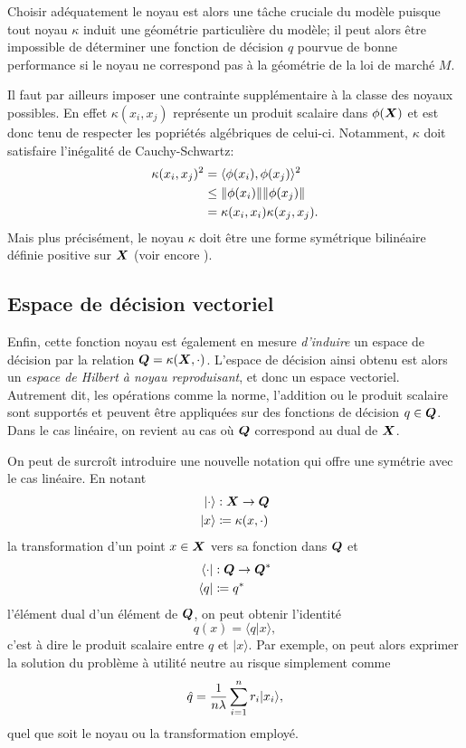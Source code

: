 Choisir adéquatement le noyau est alors une tâche cruciale du modèle puisque tout noyau
$\kappa$ induit une géométrie particulière du modèle; il peut alors être impossible de
déterminer une fonction de décision $q$ pourvue de bonne performance si le noyau ne
correspond pas à la géométrie de la loi de marché $M$.

Il faut par ailleurs imposer une contrainte supplémentaire à la classe des noyaux
possibles. En effet $\kappa(x_i,x_j)$ représente un produit scalaire dans $\phi(\bm{X})$ et est donc
tenu de respecter les popriétés algébriques de celui-ci. Notamment, $\kappa$ doit satisfaire
l'inégalité de Cauchy-Schwartz:
\begin{align}
  \kappa(x_i,x_j)^2 &= \langle\phi(x_i),\phi(x_j)\rangle^2\\
               &\leq \|\phi(x_i)\|\|\phi(x_j)\|\\
               &= \kappa(x_i,x_i)\kappa(x_j,x_j).
\end{align}
Mais plus précisément, le noyau $\kappa$ doit être une forme symétrique bilinéaire définie
positive sur $\bm{X}$ (voir encore \cite{mohri2012foundations,scholkopf2001learning}).




\subsection{Espace de décision vectoriel}


Enfin, cette fonction noyau est également en mesure \textit{d'induire} un espace de
décision par la relation $\bm Q = \kappa(\bm{X},\cdot)$. L'espace de décision ainsi obtenu est alors un
\textit{espace de Hilbert à noyau reproduisant}, et donc un espace vectoriel. Autrement
dit, les opérations comme la norme, l'addition ou le produit scalaire sont supportés et
peuvent être appliquées sur des fonctions de décision $q \in \bm Q$. Dans le cas linéaire, on
revient au cas où $\bm Q$ correspond au dual de $\bm{X}$. 

On peut de surcroît introduire une nouvelle notation qui offre une symétrie avec le cas
linéaire. En notant
\begin{align}
  |\cdot\rangle&:\bm{X} \to \bm Q \\ 
|x\rangle &\coloneqq \kappa(x,\cdot)
\end{align}
la transformation d'un point $x\in\bm{X}$ vers sa fonction dans $\bm Q$ et  
\begin{align}
  \langle\cdot|&:\bm Q \to \bm Q^*\\
  \langle q| &\coloneqq q^*
\end{align}
l'élément dual d'un élément de $\bm Q$, on peut obtenir l'identité
\begin{equation}
  q(x) = \langle q|x \rangle,
\end{equation}
c'est à dire le produit scalaire entre $q$ et $|x\rangle$. Par exemple, on peut alors exprimer
la solution du problème à utilité neutre au risque simplement comme
\begin{equation}
  \hat q = \frac{1}{n\lambda}\sum_{i=1}^n r_i|x_i\rangle,
\end{equation}
quel que soit le noyau ou la transformation employé.


